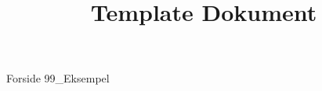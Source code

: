 \documentclass[a4paper,openany]{memoir}
\title{Template Dokument}
\begin{document}
	{Forside}  \newpage
	\tableofcontents\thispagestyle{fancy}  \newpage
	{99_Eksempel}  \newpage
\end{document}
